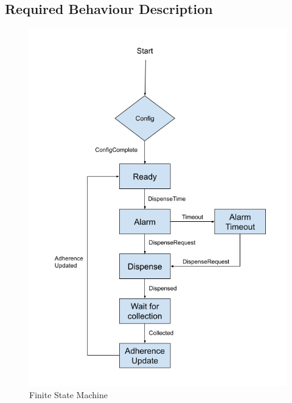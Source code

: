 \documentclass[12pt]{article}
\begin{document}

\subsection{Required Behaviour Description}

\begin{figure}[H]
    \centering
    \includegraphics[width=.45\textwidth,height=.45\textheight,keepaspectratio]{project_requirements/FSM.png}
    \caption{Finite State Machine}
    \label{fig:my_label}
\end{figure}
\end{document}
